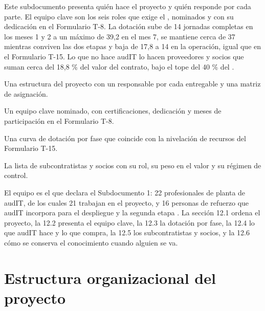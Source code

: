
\begin{resumenApertura}
Este subdocumento presenta quién hace el proyecto y quién responde por cada parte. El equipo clave son
los seis roles que exige el , nominados y con su dedicación en el Formulario T-8. La
dotación sube de 14 jornadas completas en los meses 1 y 2 a un máximo de 39,2 en el mes 7, se mantiene
cerca de 37 mientras conviven las dos etapas y baja de 17,8 a 14 en la operación, igual que en el
Formulario T-15. Lo que no hace audIT lo hacen proveedores y socios que suman cerca del 18,8 \% del
valor del contrato, bajo el tope del 40 \% del .
\begin{recibe}
  \item Una estructura del proyecto con un responsable por cada entregable y una matriz de asignación.
  \item Un equipo clave nominado, con certificaciones, dedicación y meses de participación en el Formulario T-8.
  \item Una curva de dotación por fase que coincide con la nivelación de recursos del Formulario T-15.
  \item La lista de subcontratistas y socios con su rol, su peso en el valor y su régimen de control.
\end{recibe}
\end{resumenApertura}

El equipo es el que declara el Subdocumento 1: 22 profesionales de planta de audIT, de los cuales 21
trabajan en el proyecto, y 16 personas de refuerzo que audIT incorpora para el despliegue y la segunda
etapa . La sección 12.1 ordena el proyecto, la 12.2 presenta el equipo clave, la 12.3 la
dotación por fase, la 12.4 lo que audIT hace y lo que compra, la 12.5 los subcontratistas y socios, y la
12.6 cómo se conserva el conocimiento cuando alguien se va.

\section{Estructura organizacional del proyecto}\label{sec:12-estructura-organizacional-del-pr}


